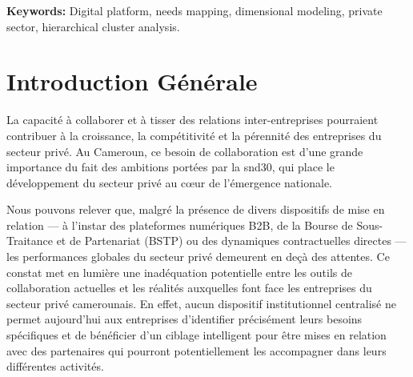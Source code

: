 \documentclass[12pt, a4paper, oneside]{report}
\begin{document}
	\vspace{0.5cm}
	\noindent \textbf{Keywords:} Digital platform, needs mapping, dimensional modeling, private sector, hierarchical cluster analysis.
	
	\medskip
	
	

\listoftables
{}


	\listoffigures
	

	
	
	\setcounter{page}{1}
	
	\chapter*{Introduction Générale}
	
La capacité à collaborer et à tisser des relations inter-entreprises pourraient contribuer à la croissance, la compétitivité et la pérennité des entreprises du secteur privé. Au Cameroun, ce besoin de collaboration est d'une grande importance du fait des ambitions portées par la \gls{snd30}, qui place le développement du secteur privé au cœur de l'émergence nationale.

 
Nous pouvons relever que, malgré la présence de divers dispositifs de mise en relation --- à l'instar des plateformes numériques B2B, de la Bourse de Sous-Traitance et de Partenariat (BSTP) ou des dynamiques contractuelles directes --- les performances globales du secteur privé demeurent en deçà des attentes. Ce constat met en lumière une inadéquation potentielle entre les outils de collaboration actuelles et les réalités auxquelles font face les entreprises du secteur privé camerounais. En effet, aucun dispositif institutionnel centralisé ne permet aujourd'hui aux entreprises d'identifier précisément leurs besoins spécifiques et de bénéficier d'un ciblage intelligent pour être mises en relation avec des partenaires qui pourront potentiellement les accompagner dans leurs différentes activités. 
\end{document}
